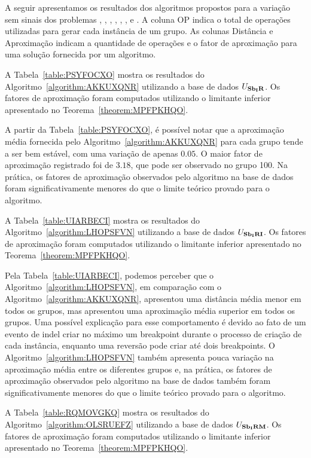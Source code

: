 A seguir apresentamos os resultados dos algoritmos propostos para a variação sem sinais dos problemas \SbIR{}, \SbIRI{}, \SbIRM{}, \SbIRMI{}, \SbIRT{}, \SbIRTI{}, \SbIRTM{} e \SbIRTMI{}. A coluna OP indica o total de operações utilizadas para gerar cada instância de um grupo. As colunas Distância e Aproximação indicam a quantidade de operações e o fator de aproximação para uma solução fornecida por um algoritmo.

A Tabela~\ref{table:PSYFOCXO} mostra os resultados do Algoritmo~\ref{algorithm:AKKUXQNR} utilizando a base de dados $U_{\textbf{Sb\textsubscript{I}R}}{}$. Os fatores de aproximação foram computados utilizando o limitante inferior apresentado no Teorema~\ref{theorem:MPFPKHQO}.



A partir da Tabela~\ref{table:PSYFOCXO}, é possível notar que a aproximação média fornecida pelo Algoritmo~\ref{algorithm:AKKUXQNR} para cada grupo tende a ser bem estável, com uma variação de apenas $0.05$. O maior fator de aproximação registrado foi de $3.18$, que pode ser observado no grupo 100. Na prática, os fatores de aproximação observados pelo algoritmo na base de dados foram significativamente menores do que o limite teórico provado para o algoritmo.  

A Tabela~\ref{table:UIARBECI} mostra os resultados do Algoritmo~\ref{algorithm:LHOPSFVN} utilizando a base de dados $U_{\textbf{Sb\textsubscript{I}RI}}{}$. Os fatores de aproximação foram computados utilizando o limitante inferior apresentado no Teorema~\ref{theorem:MPFPKHQO}.



Pela Tabela~\ref{table:UIARBECI}, podemos perceber que o Algoritmo~\ref{algorithm:LHOPSFVN}, em comparação com o Algoritmo~\ref{algorithm:AKKUXQNR}, apresentou uma distância média menor em todos os grupos, mas apresentou uma aproximação média superior em todos os grupos. Uma possível explicação para esse comportamento é devido ao fato de um evento de indel criar no máximo um breakpoint durante o processo de criação de cada instância, enquanto uma reversão pode criar até dois breakpoints. O Algoritmo~\ref{algorithm:LHOPSFVN} também apresenta pouca variação na aproximação média entre os diferentes grupos e, na prática, os fatores de aproximação observados pelo algoritmo na base de dados também foram significativamente menores do que o limite teórico provado para o algoritmo.

A Tabela~\ref{table:RQMOVGKQ} mostra os resultados do Algoritmo~\ref{algorithm:OLSRUEFZ} utilizando a base de dados $U_{\textbf{Sb\textsubscript{I}RM}}{}$. Os fatores de aproximação foram computados utilizando o limitante inferior apresentado no Teorema~\ref{theorem:MPFPKHQO}.

